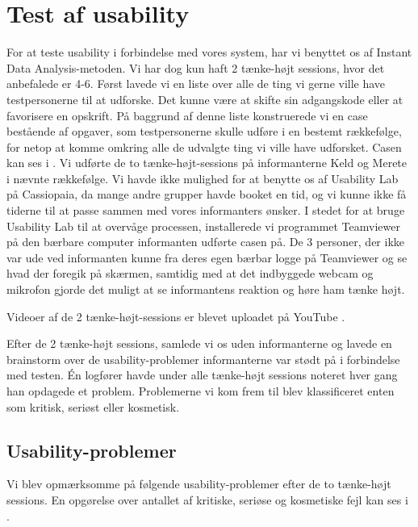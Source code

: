 \section{Test af usability}
\label{sec:usability}

For at teste usability i forbindelse med vores system, har vi benyttet os af Instant Data Analysis-metoden\cite{debida}. Vi har dog kun haft 2 tænke-højt sessions, hvor det anbefalede er 4-6. Først lavede vi en liste over alle de ting vi gerne ville have testpersonerne til at udforske. Det kunne \fx være at skifte sin adgangskode eller at favorisere en opskrift. På baggrund af denne liste konstruerede vi en case bestående af opgaver, som testpersonerne skulle udføre i en bestemt rækkefølge, for netop at komme omkring alle de udvalgte ting vi ville have udforsket. Casen kan ses i . Vi udførte de to tænke-højt-sessions på informanterne Keld og Merete i nævnte rækkefølge. Vi havde ikke mulighed for at benytte os af Usability Lab på Cassiopaia, da mange andre grupper havde booket en tid, og vi kunne ikke få tiderne til at passe sammen med vores informanters ønsker. I stedet for at bruge Usability Lab til at overvåge processen, installerede vi programmet Teamviewer på den bærbare computer informanten udførte casen på. De 3 personer, der ikke var ude ved informanten kunne fra deres egen bærbar logge på Teamviewer og se hvad der foregik på skærmen, samtidig med at det indbyggede webcam og mikrofon gjorde det muligt at se informantens reaktion og høre ham tænke højt.

Videoer af de 2 tænke-højt-sessions er blevet uploadet på YouTube \cite{usabilitykjeld} \cite{usabilitymerete}.

Efter de 2 tænke-højt sessions, samlede vi os uden informanterne og lavede en brainstorm over de usability-problemer informanterne var stødt på i forbindelse med testen. Én logfører havde under alle tænke-højt sessions noteret hver gang han opdagede et problem. Problemerne vi kom frem til blev klassificeret enten som kritisk, seriøst eller kosmetisk.

\subsection{Usability-problemer}
Vi blev opmærksomme på følgende usability-problemer efter de to tænke-højt sessions. En opgørelse over antallet af kritiske, seriøse og kosmetiske fejl kan ses i .

